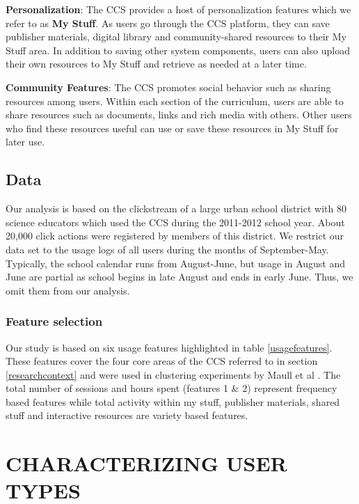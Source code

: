 \documentclass{acm_proc_article-sp}
\begin{document}
\textbf{Personalization}:
The CCS provides a host of personalization features which we refer to as \textbf{My Stuff}. As users go through the CCS platform, they can save publisher materials, digital library and community-shared resources to their My Stuff area. In addition to saving other system components, users can also upload their own resources to My Stuff and retrieve as needed at a later time.

\textbf{Community Features}:
The CCS promotes social behavior such as sharing resources among users. Within each section of the curriculum, users are able to share resources such as documents, links and rich media with others. Other users who find these resources useful can use or save these resources in My Stuff for later use.

\subsection{Data}
Our analysis is based on the clickstream of a large urban school district with 80 science educators which used the CCS during the 2011-2012 school year. About 20,000 click actions were registered by members of this district. We restrict our data set to the usage logs of all users during the months of September-May. Typically, the school calendar runs from August-June, but usage in August and June are partial as school begins in late August and ends in early June. Thus, we omit them from our analysis.

\subsubsection{Feature selection}\label{usagefeaturesection}
Our study is based on six usage features highlighted in table \ref{usagefeatures}. These features cover the four core areas of the CCS referred to in section \ref{researchcontext} and were used in clustering experiments by Maull et al \cite{maullunderstanding}. The total number of sessions and hours spent (features 1 \& 2) represent frequency based features while total activity within my stuff, publisher materials, shared stuff and interactive resources are variety based features. 

\section{CHARACTERIZING USER TYPES}\label{charusertypes}
\end{document}

